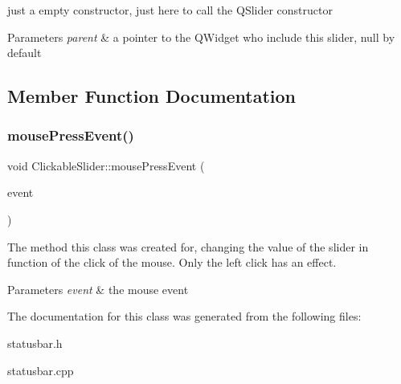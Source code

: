 just a empty constructor, just here to call the Q\+Slider constructor 


\begin{DoxyParams}{Parameters}
{\em parent} & a pointer to the Q\+Widget who include this slider, null by default \\
\hline
\end{DoxyParams}


\subsection{Member Function Documentation}
\mbox{\label{classClickableSlider_aa71c72cea3732cb9e8753bd64305d913}} 
\subsubsection{\texorpdfstring{mouse\+Press\+Event()}{mousePressEvent()}}
{\footnotesize\ttfamily void Clickable\+Slider\+::mouse\+Press\+Event (\begin{DoxyParamCaption}\item[{Q\+Mouse\+Event $\ast$}]{event }\end{DoxyParamCaption})}



The method this class was created for, changing the value of the slider in function of the click of the mouse. Only the left click has an effect. 


\begin{DoxyParams}{Parameters}
{\em event} & the mouse event \\
\hline
\end{DoxyParams}


The documentation for this class was generated from the following files\+:\begin{DoxyCompactItemize}
\item 
statusbar.\+h\item 
statusbar.\+cpp\end{DoxyCompactItemize}
